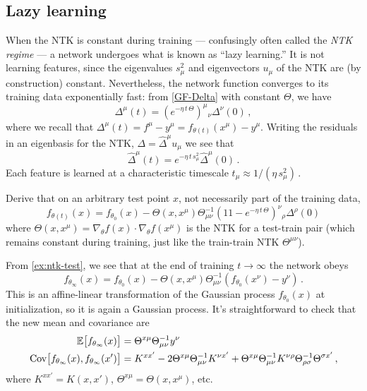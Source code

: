 \documentclass[11pt]{article}
\newcommand{\E}{\mathbb{E}}
\begin{document}
\subsection{Lazy learning}
\label{sec:lazy}

When the NTK is constant during training --- confusingly often called the \emph{NTK regime} --- a network undergoes what is known as ``lazy learning.'' It is not learning features, since the eigenvalues $s_\mu^2$ and eigenvectors $u_\mu$ of the NTK are (by construction) constant. Nevertheless, the network function converges to its training data exponentially fast: from \eqref{GF-Delta} with constant $\Theta$, we have
%
\begin{equation}
     \Delta^\mu(t) = (e^{-\eta\, t\, \Theta})^\mu{}_\nu \Delta^\nu(0)\,, \label{exp-const}
\end{equation}
%
where we recall that $\Delta^\mu(t) = f^\mu-y^\mu = f_{\theta(t)}(x^\mu)-y^\mu$. Writing the residuals in an eigenbasis for the NTK, $\Delta=\hat \Delta^{\mu}u_{\mu}$ we see that
%
\begin{equation}
    \hat \Delta^\mu(t) = e^{-\eta\,t\,s_\mu^2} \hat \Delta^\mu(0)\,. \label{D-converge} 
\end{equation} 
%
Each feature is learned at a characteristic timescale $t_\mu \approx 1/(\eta\, s_\mu^2)$\,.

\begin{exercise}
\label{ex:ntk-test}
Derive that on an arbitrary test point $x$, not necessarily part of the training data,
%
\begin{equation}
    f_{\theta(t)}(x) = f_{\theta_0}(x) - \Theta(x,x^\mu) \Theta^{-1}_{\mu\nu} (1\!\!1-e^{-\eta\,t\,\Theta})^{\nu}{}_\rho\Delta^\rho(0) \label{NTK-learn}
\end{equation}
%
where $\Theta(x,x^\mu) = \nabla_\theta f(x)\cdot \nabla_\theta f(x^\mu)$ is the NTK for a test-train pair (which remains constant during training, just like the train-train NTK $\Theta^{\mu\nu}$).
\end{exercise}

From \cref{ex:ntk-test}, we see that at the end of training $t\to\infty$ the network obeys
%
\begin{equation}
    f_{\theta_\infty}(x) = f_{\theta_0}(x)- \Theta(x,x^\mu) \Theta^{-1}_{\mu\nu} (f_{\theta_0}(x^\nu)-y^\nu)\,.
\end{equation}
%
This is an affine-linear transformation of the Gaussian process $f_{\theta_0}(x)$ at initialization, so it is again a Gaussian process. It's straightforward to check that the new mean and covariance are
%
\begin{align} \E\big[ f_{\theta_\infty}(x)\big] &= \Theta^{x\mu}\Theta^{-1}_{\mu\nu}y^\nu \label{NTK-GP} \\
\text{Cov}\big[f_{\theta_\infty}(x),f_{\theta_\infty}(x')\big] &= K^{xx'} - 2\Theta^{x\mu}\Theta^{-1}_{\mu\nu}K^{\nu x'}+\Theta^{x\mu}\Theta^{-1}_{\mu\nu}K^{\nu \rho}\Theta^{-1}_{\rho\sigma} \Theta^{\sigma x'}\,, \notag
\end{align}
%
where $K^{xx'}=K(x,x')$, $\Theta^{x\mu}=\Theta(x,x^\mu)$, etc.
\end{document}
